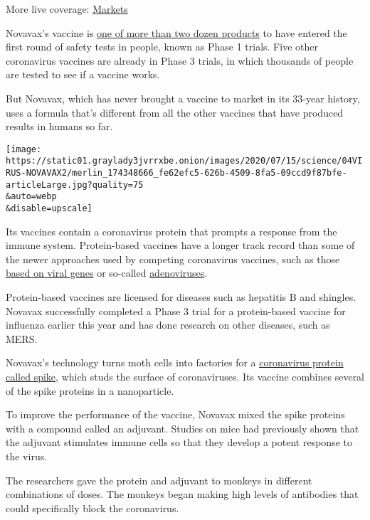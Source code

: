 More live coverage:
\href{https://www.nytimes3xbfgragh.onion/live/2020/09/04/business/stock-market-today-coronavirus?action=click\&pgtype=Article\&state=default\&region=MAIN_CONTENT_1\&context=storylines_live_updates}{Markets}

Novavax's vaccine is
\href{https://www.nytimes3xbfgragh.onion/interactive/2020/science/coronavirus-vaccine-tracker.html}{one
of more than two dozen products} to have entered the first round of
safety tests in people, known as Phase 1 trials. Five other coronavirus
vaccines are already in Phase 3 trials, in which thousands of people are
tested to see if a vaccine works.

But Novavax, which has never brought a vaccine to market in its 33-year
history, uses a formula that's different from all the other vaccines
that have produced results in humans so far.

\texttt{[image: https://static01.graylady3jvrrxbe.onion/images/2020/07/15/science/04VIRUS-NOVAVAX2/merlin\_174348666\_fe62efc5-626b-4509-8fa5-09ccd9f87bfe-articleLarge.jpg?quality=75\\\&auto=webp\\\&disable=upscale]}

Its vaccines contain a coronavirus protein that prompts a response from
the immune system. Protein-based vaccines have a longer track record
than some of the newer approaches used by competing coronavirus
vaccines, such as those
\href{https://www.nytimes3xbfgragh.onion/2020/07/28/health/coronavirus-moderna-vaccine-monkeys.html}{based
on viral genes} or so-called
\href{https://www.nytimes3xbfgragh.onion/2020/07/20/world/covid-coronavirus-vaccine.html}{adenoviruses}.

Protein-based vaccines are licensed for diseases such as hepatitis B and
shingles. Novavax successfully completed a Phase 3 trial for a
protein-based vaccine for influenza earlier this year and has done
research on other diseases, such as MERS.

Novavax's technology turns moth cells into factories for a
\href{https://www.nytimes3xbfgragh.onion/2020/07/28/health/coronavirus-mutation-spike-treatment.html}{coronavirus
protein called spike}, which studs the surface of coronaviruses. Its
vaccine combines several of the spike proteins in a nanoparticle.

To improve the performance of the vaccine, Novavax mixed the spike
proteins with a compound called an adjuvant. Studies on mice had
previously shown that the adjuvant stimulates immune cells so that they
develop a potent response to the virus.

The researchers gave the protein and adjuvant to monkeys in different
combinations of doses. The monkeys began making high levels of
antibodies that could specifically block the coronavirus.

